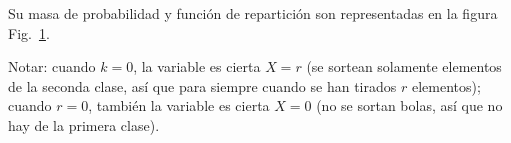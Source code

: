 Su masa  de probabilidad  y funci\'on de  repartici\'on son representadas  en la
figura Fig.~\ref{Fig:MP:HipergeometricaNegativa}.
%
\begin{figure}[h!]
\begin{center}  \end{center}
%
\label{Fig:MP:HipergeometricaNegativa}
\end{figure}


Notar: cuando  $k =  0$, la  variable es cierta  $X =  r$ (se  sortean solamente
elementos de la seconda clase, as\'i  que para siempre cuando se han tirados $r$
elementos); cuando  $r =  0$, tambi\'en  la variable es  cierta $X  = 0$  (no se
sortan bolas, as\'i que no hay de la primera clase).

